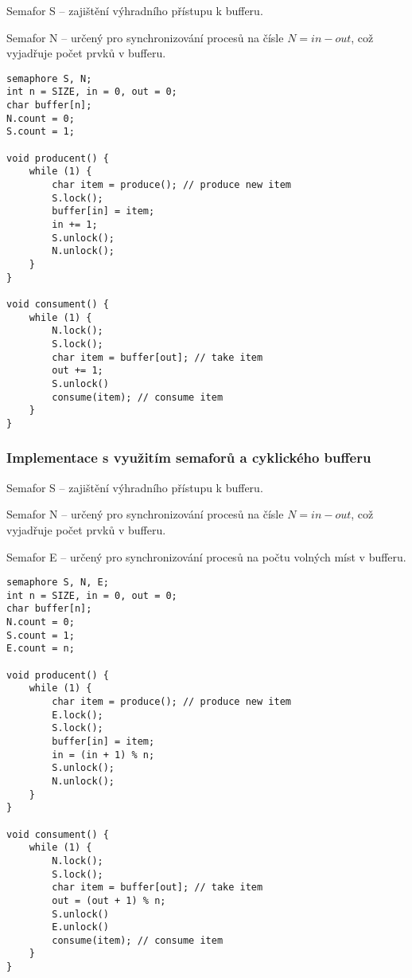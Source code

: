 \begin{compactitem}
    \item Semafor S -- zajištění výhradního přístupu k bufferu.
    \item Semafor N -- určený pro synchronizování procesů na čísle $N = in - out$, což vyjadřuje počet prvků v bufferu.
\end{compactitem}

\noindent\begin{minipage}{\linewidth}
\begin{lstlisting}[language=c_language, caption={Implementace s využitím semaforů.}]
semaphore S, N;
int n = SIZE, in = 0, out = 0;
char buffer[n];
N.count = 0;
S.count = 1;

void producent() {
    while (1) {
        char item = produce(); // produce new item
        S.lock();
        buffer[in] = item;
        in += 1;
        S.unlock();
        N.unlock();
    }
}

void consument() {
    while (1) {
        N.lock();
        S.lock();
        char item = buffer[out]; // take item
        out += 1;
        S.unlock()
        consume(item); // consume item
    }
}
\end{lstlisting}
\end{minipage}

\subsubsection{Implementace s využitím semaforů a cyklického bufferu}

\begin{compactitem}
    \item Semafor S -- zajištění výhradního přístupu k bufferu.
    \item Semafor N -- určený pro synchronizování procesů na čísle $N = in - out$, což vyjadřuje počet prvků v bufferu.
    \item Semafor E -- určený pro synchronizování procesů na počtu volných míst v bufferu.
\end{compactitem}

\noindent\begin{minipage}{\linewidth}
\begin{lstlisting}[language=c_language, caption={Implementace s využitím semaforů a cyklického bufferu.}]
semaphore S, N, E;
int n = SIZE, in = 0, out = 0;
char buffer[n];
N.count = 0;
S.count = 1;
E.count = n;

void producent() {
    while (1) {
        char item = produce(); // produce new item
        E.lock();
        S.lock();
        buffer[in] = item;
        in = (in + 1) % n;
        S.unlock();
        N.unlock();
    }
}

void consument() {
    while (1) {
        N.lock();
        S.lock();
        char item = buffer[out]; // take item
        out = (out + 1) % n;
        S.unlock()
        E.unlock()
        consume(item); // consume item
    }
}
\end{lstlisting}
\end{minipage}

